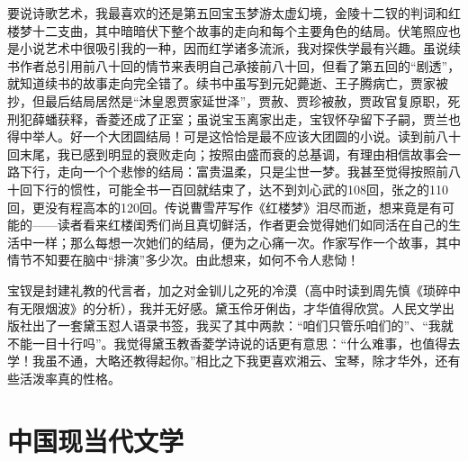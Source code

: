 \par 要说诗歌艺术，我最喜欢的还是第五回宝玉梦游太虚幻境，金陵十二钗的判词和红楼梦十二支曲，其中暗暗伏下整个故事的走向和每个主要角色的结局。伏笔照应也是小说艺术中很吸引我的一种，因而红学诸多流派，我对探佚学最有兴趣。虽说续书作者总引用前八十回的情节来表明自己承接前八十回，但看了第五回的“剧透”，就知道续书的故事走向完全错了。续书中虽写到元妃薨逝、王子腾病亡，贾家被抄，但最后结局居然是“沐皇恩贾家延世泽”，贾赦、贾珍被赦，贾政官复原职，死刑犯薛蟠获释，香菱还成了正室；虽说宝玉离家出走，宝钗怀孕留下子嗣，贾兰也得中举人。好一个大团圆结局！可是这恰恰是最不应该大团圆的小说。读到前八十回末尾，我已感到明显的衰败走向；按照由盛而衰的总基调，有理由相信故事会一路下行，走向一个个悲惨的结局：富贵温柔，只是尘世一梦。我甚至觉得按照前八十回下行的惯性，可能全书一百回就结束了，达不到刘心武的108回，张之的110回，更没有程高本的120回。传说曹雪芹写作《红楼梦》泪尽而逝，想来竟是有可能的——读者看来红楼闺秀们尚且真切鲜活，作者更会觉得她们如同活在自己的生活中一样；那么每想一次她们的结局，便为之心痛一次。作家写作一个故事，其中情节不知要在脑中“排演”多少次。由此想来，如何不令人悲恸！
\par 宝钗是封建礼教的代言者，加之对金钏儿之死的冷漠（高中时读到周先慎《琐碎中有无限烟波》的分析），我并无好感。黛玉伶牙俐齿，才华值得欣赏。人民文学出版社出了一套黛玉怼人语录书签，我买了其中两款：“咱们只管乐咱们的”、“我就不能一目十行吗”。我觉得黛玉教香菱学诗说的话更有意思：“什么难事，也值得去学！我虽不通，大略还教得起你。”相比之下我更喜欢湘云、宝琴，除才华外，还有些活泼率真的性格。
\par {}

\section{中国现当代文学}

